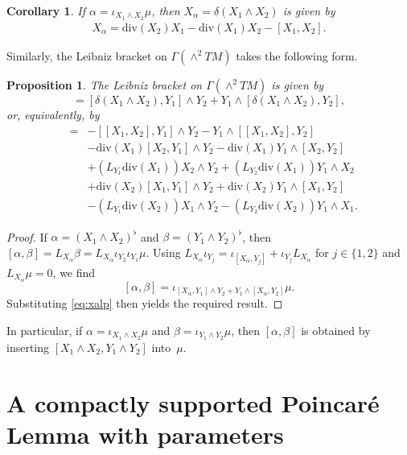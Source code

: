 \documentclass{article}
\newcommand{\Div}{\mathrm{div}}
\newtheorem{Proposition}[Theorem]{Proposition}
\newtheorem{Corollary}[Theorem]{Corollary}
\theoremstyle{definition}
\begin{document}
\begin{Corollary}\label{Corollary:deltaBivector}
If $\alpha = \iota_{X_1\wedge X_2}\mu$, then $X_{\alpha} = \delta(X_1\wedge X_2)$ is given by
\begin{align}\label{eq:xalp}
     X_{\alpha} = \Div(X_2)X_1 - \Div(X_1)X_2 - [X_1,X_2].
\end{align}
 \end{Corollary}

Similarly, the Leibniz bracket on $\Gamma(\wedge^2TM)$ takes the following form.  
\begin{Proposition}\label{Prop:bracketbivectors}
The Leibniz bracket on $\Gamma(\wedge^2TM)$ is given by 
\begin{equation*}
[X_1\wedge X_2, Y_1 \wedge Y_2] = [\delta(X_1 \wedge X_2), Y_1]\wedge Y_2 + Y_1 \wedge [\delta(X_1 \wedge X_2), Y_2],
\end{equation*}
or, equivalently, by
\begin{eqnarray*}
[X_1\wedge X_2, Y_1 \wedge Y_2] 
&=&- [[X_1,X_2], Y_1]\wedge Y_2 - Y_1 \wedge [[X_1,X_2], Y_2]\\
& & - \Div(X_1) [X_2,Y_1]\wedge Y_2 - \Div(X_1) Y_1 \wedge [X_2,Y_2]\\
& & + (L_{Y_1}\Div(X_1)) X_2 \wedge Y_2 + (L_{Y_2}\Div(X_1))Y_1 \wedge X_2\\
& & + \Div(X_2) [X_1,Y_1]\wedge Y_2 + \Div(X_2) Y_1 \wedge [X_1,Y_2]\\
& & - (L_{Y_1}\Div(X_2)) X_1 \wedge Y_2 - (L_{Y_2}\Div(X_2)) Y_1 \wedge X_1.
\end{eqnarray*}
\end{Proposition}
\begin{proof}
If $\alpha = (X_1 \wedge X_2)^{\flat}$ and $\beta = (Y_1 \wedge Y_2)^{\flat}$, then 
$[\alpha, \beta] = L_{X_{\alpha}}\beta = L_{X_{\alpha}} \iota_{Y_2}\iota_{Y_1}\mu$.
Using $L_{X_{\alpha}} \iota_{Y_{j}} = \iota_{[X_{\alpha}, Y_{j}]} + \iota_{Y_{j}}L_{X_{\alpha}}$ for $j\in \{1,2\}$ and $L_{X_{\alpha}} \mu = 0$, we find 
\[
	[\alpha, \beta] = \iota_{[X_{\alpha}, Y_1]\wedge Y_2 + Y_1 \wedge [X_{\alpha}, Y_2]}\mu.
\]
Substituting \eqref{eq:xalp} then yields the required result.
\end{proof}
In particular, if $\alpha = \iota_{X_1 \wedge X_2}\mu$ and $\beta = \iota_{Y_1 \wedge Y_2}\mu$, then $[\alpha,\beta]$ is obtained 
by inserting $[X_1\wedge X_2, Y_1 \wedge Y_2]$ into~$\mu$.


\section{A compactly supported Poincaré Lemma with parameters}\label{sec:appendixParameterPoincare}
\end{document}
